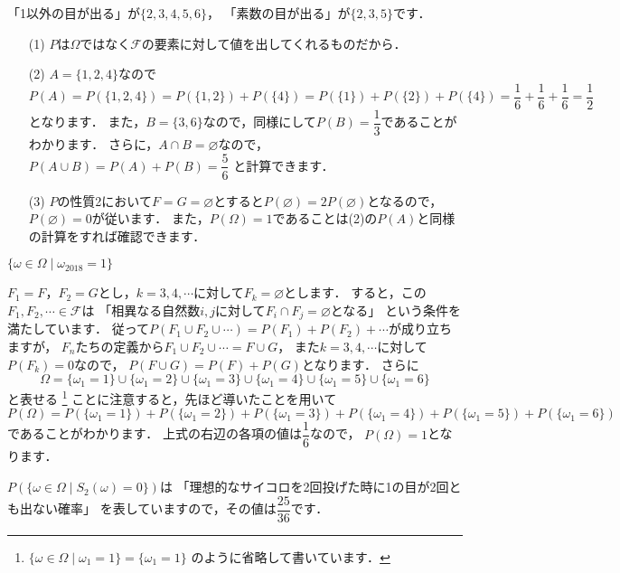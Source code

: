 \documentclass[./main]{subfiles} %
\theoremstyle{definition}
\begin{document}

「1以外の目が出る」が$\{2,3,4,5,6\}$，
「素数の目が出る」が$\{2,3,5\}$です．

\begin{itemize}
\item[(1)]
$P$は$\Omega$ではなく$\mathcal{F}$の要素に対して値を出してくれるものだから．
\item[(2)]
$A=\{1,2,4\}$なので
\[ P(A)=P(\{1,2,4\})=P(\{1,2\})+P(\{4\})=P(\{1\})+P(\{2\})+P(\{4\})
=\frac{1}{6}+\frac{1}{6}+\frac{1}{6}=\frac{1}{2} \]
となります．
また，$B=\{3,6\}$なので，同様にして$P(B)=\dfrac{1}{3}$であることがわかります．
さらに，$A\cap B=\varnothing$なので，$P(A\cup B)=P(A)+P(B)=\dfrac{5}{6}$
と計算できます．
\item[(3)]
$P$の性質2において$F=G=\varnothing$とすると$P(\varnothing)=2P(\varnothing)$となるので，
$P(\varnothing)=0$が従います．
また，$P(\Omega)=1$であることは(2)の$P(A)$と同様の計算をすれば確認できます．
\end{itemize}

$\{\omega\in\Omega\mid\omega_{2018}=1\}$

$F_1=F$，$F_2=G$とし，$k=3,4,\cdots$に対して$F_k=\varnothing$とします．
すると，この$F_1,F_2,\cdots\in\mathcal{F}$は
「相異なる自然数$i,j$に対して$F_i\cap F_j=\varnothing$となる」
という条件を満たしています．
従って$P(F_1\cup F_2\cup\cdots)=P(F_1)+P(F_2)+\cdots$が成り立ちますが，
$F_n$たちの定義から$F_1\cup F_2\cup\cdots=F\cup G$，
また$k=3,4,\cdots$に対して$P(F_k)=0$なので，
$P(F\cup G)=P(F)+P(G)$となります．
さらに
\[ \Omega=\{\omega_1=1\}\cup\{\omega_1=2\}\cup
\{\omega_1=3\}\cup\{\omega_1=4\}\cup
\{\omega_1=5\}\cup\{\omega_1=6\} \]
と表せる
\footnote{$\{\omega\in\Omega\mid\omega_1=1\}=\{\omega_1=1\}$
のように省略して書いています．}
ことに注意すると，先ほど導いたことを用いて
\[ P(\Omega)=P(\{\omega_1=1\})+P(\{\omega_1=2\})+
P(\{\omega_1=3\})+P(\{\omega_1=4\})+P(\{\omega_1=5\})+
P(\{\omega_1=6\}) \]
であることがわかります．
上式の右辺の各項の値は$\dfrac{1}{6}$なので，
$P(\Omega)=1$となります．

$P(\{\omega\in\Omega\mid S_2(\omega)=0\})
$は
「理想的なサイコロを2回投げた時に1の目が2回とも出ない確率」
を表していますので，その値は$\dfrac{25}{36}$です．
\end{document}
